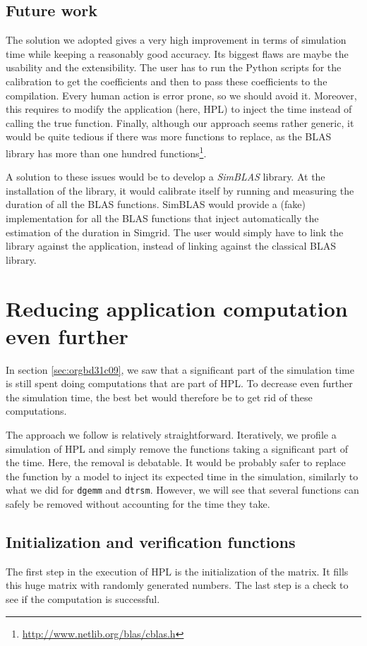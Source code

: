 \documentclass[12pt, a4paper]{memoir}
\begin{document}
\subsection{Future work}
\label{sec:org58ccb3b}
The solution we adopted gives a very high improvement in terms of simulation time while keeping a reasonably good
accuracy. Its biggest flaws are maybe the usability and the extensibility. The user has to run the Python scripts
for the calibration to get the coefficients and then to pass these coefficients to the compilation. Every human
action is error prone, so we should avoid it. Moreover, this requires to modify the application (here, HPL) to
inject the time instead of calling the true function. Finally, although our approach seems rather generic, it would
be quite tedious if there was more functions to replace, as the BLAS library has more than one hundred
functions\footnote{\url{http://www.netlib.org/blas/cblas.h}}.

A solution to these issues would be to develop a \emph{SimBLAS} library. At the installation of the library, it would
calibrate itself by running and measuring the duration of all the BLAS functions. SimBLAS would provide a (fake)
implementation for all the BLAS functions that inject automatically the estimation of the duration in Simgrid. The
user would simply have to link the library against the application, instead of linking against the classical BLAS
library.
\section{Reducing application computation even further}
\label{sec:orgaecfe1c}
In section \ref{sec:orgbd31c09}, we saw that a significant part of the simulation time is still spent doing
computations that are part of HPL. To decrease even further the simulation time, the best bet would therefore be to
get rid of these computations.

The approach we follow is relatively straightforward. Iteratively, we profile a simulation of HPL and simply remove
the functions taking a significant part of the time. Here, the removal is debatable. It would be probably safer to
replace the function by a model to inject its expected time in the simulation, similarly to what we did for \texttt{dgemm} and
\texttt{dtrsm}. However, we will see that several functions can safely be removed without accounting for the time they take.
\subsection{Initialization and verification functions}
\label{sec:org965f6ad}
The first step in the execution of HPL is the initialization of the matrix. It fills this huge matrix with randomly
generated numbers.   The last step is a check to see if the computation is successful.
\end{document}
